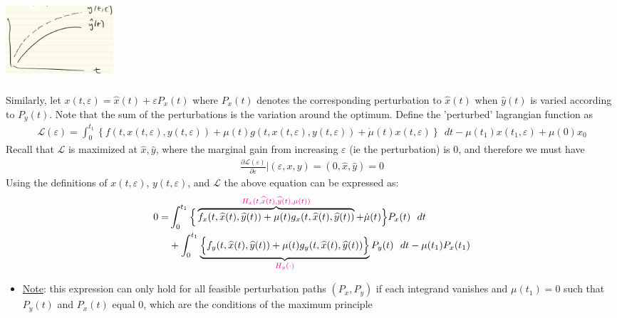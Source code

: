 \documentclass{article}
\begin{document}
\begin{itemize}
    \newline
    \begin{center}
    \includegraphics[width=4cm, height=3cm]{pic9}
    \end{center}
    Similarly, let $x(t, \varepsilon) = \widehat{x}(t) + \varepsilon P_{x}(t)$ where $P_{x}(t)$ denotes the corresponding perturbation to $\widehat{x}(t)$ when $\widehat{y}(t)$ is varied according to $P_{y}(t)$. Note that the sum of the perturbations is the variation around the optimum. Define the 'perturbed' lagrangian function as
    \begin{gather*}
    \mathcal{L}(\varepsilon) = \int_{0}^{t_{1}} \left\{ f(t,x(t,\varepsilon),y(t,\varepsilon)) + \mu(t)g(t,x(t,\varepsilon),y(t,\varepsilon)) + \dot{\mu}(t) x(t,\varepsilon) \right\} \ \ dt - \mu(t_{1})x(t_{1}, \varepsilon)+\mu(0)x_{0}
    \end{gather*}
    Recall that $\mathcal{L}$ is maximized at $\widehat{x},\widehat{y}$, where the marginal gain from increasing $\varepsilon$ (ie the perturbation) is 0, and therefore we must have
    \begin{gather*}
    \tfrac{\partial \mathcal{L}(\varepsilon)}{\partial \varepsilon} | (\varepsilon, x, y) = (0, \widehat{x}, \widehat{y}) = 0
    \end{gather*}
    Using the definitions of $x(t,\varepsilon)$, $y(t,\varepsilon)$, and $\mathcal{L}$ the above equation can be expressed as:
    \begin{align*}
     0 = &\int_{0}^{t_{1}} \Big\{ \overbrace{f_{x}(t,\widehat{x}(t),\widehat{y}(t)) + \mu(t)g_{x}(t,\widehat{x}(t),\widehat{y}(t))}^{ \begingroup\color{magenta} H_{x}(t,\widehat{x}(t), \widehat{y}(t), \mu(t)) \endgroup} + \dot{\mu}(t) \Big\} P_{x}(t) \ \ dt \\ &+ \int_{0}^{t_{1}} \underbrace{\Big\{f_{y}(t,\widehat{x}(t), \widehat{y}(t)) + \mu(t)g_{y}(t,\widehat{x}(t), \widehat{y}(t)) \Big\} }_{\begingroup\color{magenta}H_{y}(\cdot)\endgroup} P_{y}(t) \ \ dt - \mu(t_{1})P_{x}(t_{1})
    \end{align*}
    \begin{itemize}
        \item  \underline{Note}: this expression can only hold for all feasible perturbation paths $(P_{x}, P_{y})$ if each integrand vanishes and $\mu(t_{1}) = 0$ such that $P_{y}(t)$ and $P_{x}(t)$ equal 0, which are the conditions of the maximum principle
    \end{itemize}
\end{itemize}
\end{document}
